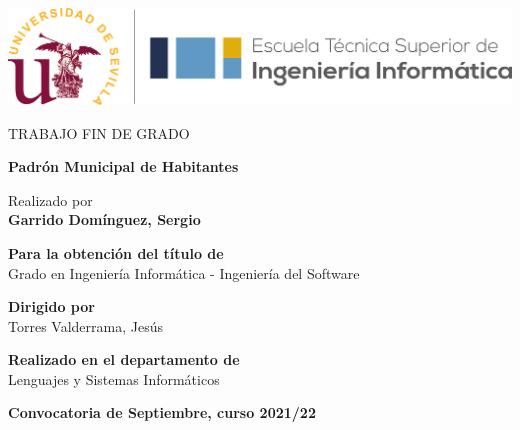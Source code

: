 \begin{center}

\vspace*{1cm}

\includegraphics[width=\textwidth]{fig/etsii_us.png}

\vspace*{3cm}
\begin{large}
TRABAJO FIN DE GRADO
\end{large}

\vspace*{0.1in}
\textbf{\huge Padrón Municipal de Habitantes} %

\vspace*{.2in}

{\large Realizado por}\\
\textbf{\Large Garrido Domínguez, Sergio} %

\vspace*{3cm}

\textbf{Para la obtención del título de}\\
{\large Grado en Ingeniería Informática - Ingeniería del Software } %

\vspace*{0.2in}

\textbf{Dirigido por}\\
{\large Torres Valderrama, Jesús}\\ %

\vspace*{0.2in}

\textbf{Realizado en el departamento de}\\
{\large Lenguajes y Sistemas Informáticos}

\vspace*{.6in}
\textbf{\Large Convocatoria de Septiembre, curso 2021/22} %

\end{center}


\thispagestyle{empty} %
\clearpage\setcounter{page}{1} %
